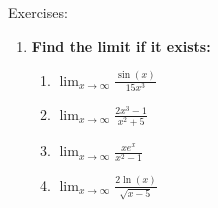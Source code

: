 \documentclass[../revisedmain.tex]{subfiles}
\begin{document}
	\begin{center}
		{\LARGE Exercises:}
	\end{center}
	\begin{enumerate}
		\item\textbf{ Find the limit if it exists:}
		\begin{enumerate}
			\item $\lim_{x\to\infty}\frac{\sin(x)}{15x^3}$
			\item $\lim_{x\to\infty}\frac{2x^3-1}{x^2+5}$
			\item $\lim_{x\to\infty}\frac{xe^x}{x^2-1}$
			\item $\lim_{x\to\infty}\frac{2\ln(x)}{\sqrt{x-5}}$
		\end{enumerate}
	\end{enumerate}
\end{document}
